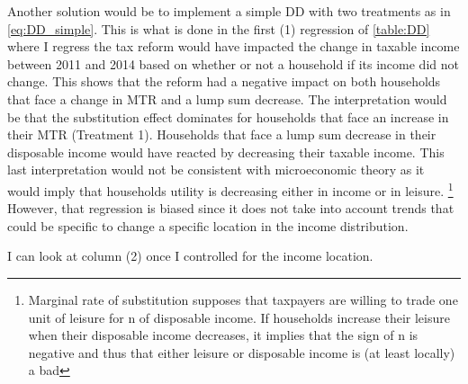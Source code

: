 \begin{subappendices}
Another solution would be to implement a simple DD with two treatments as in \autoref{eq:DD_simple}. This is what is done in the first (1) regression of \autoref{table:DD}  where I regress the tax reform would have impacted the change in taxable income between 2011 and 2014 based on whether or not a household if its income did not change. This shows that the reform had a negative impact on both households that face a change in MTR and a lump sum decrease. The interpretation would be that the substitution effect dominates for households that face an increase in their MTR (Treatment 1). Households that face a lump sum decrease in their disposable income would have reacted by decreasing their taxable income. This last interpretation would not be consistent with microeconomic theory as it would imply that households utility is decreasing either in income or in leisure.
\footnote{Marginal rate of substitution supposes that taxpayers are willing to trade one unit of leisure for n of disposable income. If households increase their leisure when their disposable income decreases, it implies that the sign of n is negative and thus that either leisure or disposable income is (at least locally) a bad}
However, that regression is biased since it does not take into account trends that could be specific to change a specific location in the income distribution.


 I can look at column (2) once I controlled for the income location. 






\end{subappendices}
